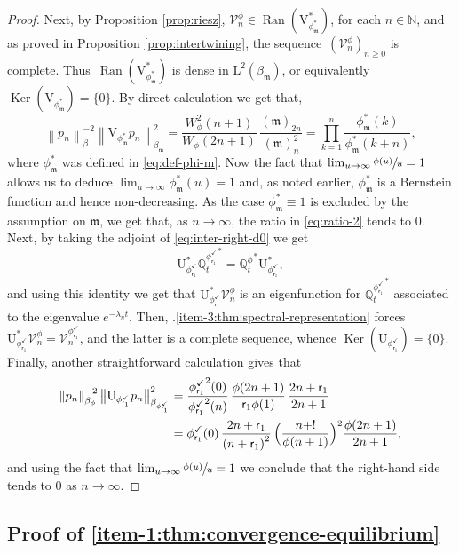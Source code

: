 \documentclass[JEP,XML,SOM,Unicode]{cedram}
\theoremstyle{plain}
\theoremstyle{definition}
\newcommand{\norm}[1]{\left\lVert#1\right\rVert}
\newcommand{\bnorm}[1]{\bigl\lVert#1\bigr\rVert}
\DeclareMathOperator{\Ran}{Ran}
\DeclareMathOperator{\Ker}{Ker}
\newcommand{\N}{\mathbb{N}}
\newcommand{\V}{\mathcal{V}}
\newcommand{\J}{\mathds{Q}}
\newcommand{\Leb}{\mathrm{L}}
\newcommand{\m}{\mathfrak{m}}
\newcommand{\lam}{{\bm{\lambda}_1}}
\newcommand{\vat}{{\mathsf{r}_1}}
\newcommand{\phm}{{\phi_\m^*}}
\renewcommand{\varphi}{{\phi_{\vat}^{\checkmark}}}
\newcommand{\gab}[1][\lam,\mo]{{\beta_{#1}}}
\let\mo\mu
\let\bpsi\beta
\begin{document}
\begin{proof}
Next, by Proposition \ref{prop:riesz}, \hbox{$\V_n^\phi \in \Ran(\mathrm{V}_{\phm}^*)$}, for each $n \in \N$, and as proved in Proposition \ref{prop:intertwining}, the sequence~$(\V_n^\phi)_{n \geq 0}$ is complete. Thus~$\Ran(\mathrm{V}_{\phm}^*)$ is dense in $\Leb^2(\gab[\m])$, or equivalently $\Ker(\mathrm{V}_{\phm}) = \{0\}$. By direct calculation we get that,
\begin{equation}
\label{eq:ratio-2}
\norm{p_n}_{\bpsi}^{-2} \norm{\mathrm{V}_{\phm} p_n}_{\gab[\m]}^2 = \frac{W_\phi^2(n+1)}{W_\phi(2n+1)}\, \frac{(\m)_{2n}}{(\m)_n^2} = \prod_{k=1}^n \frac{\phm(k)}{\phm(k+n)},
\end{equation}
where $\phm$ was defined in \eqref{eq:def-phi-m}. Now the fact that $\lim_{u \to \infty} \sfrac{\phi(u)}{u} = 1$ allows us to deduce $\lim_{u \to \infty} \phm(u) = 1$ and, as noted earlier, $\phm$ is a Bernstein function and hence non-decreasing. As the case $\phm \equiv 1$ is excluded by the assumption on $\m$, we get that, as $n \to \infty$, the ratio in \eqref{eq:ratio-2} tends to 0. Next, by taking the adjoint of \eqref{eq:inter-right-d0} we get
\begin{equation*}
\mathrm{U}_\varphi^* {\J_t^\varphi}^* = {\J_t^\phi}^* \mathrm{U}_\varphi^*,
\end{equation*}
and using this identity we get that $\mathrm{U}_\varphi^* \V_n^\phi$ is an eigenfunction for ${\J_t^\varphi}^*$ associated to the eigenvalue $e^{-\lambda_n t}$. Then, .\eqref{item-3:thm:spectral-representation} forces $\mathrm{U}_\varphi^* \V_n^\phi = \V_n^\varphi$, and the latter is a complete sequence, whence $\Ker(\mathrm{U}_\varphi) = \{0\}$. Finally, another straightforward calculation gives that
\begin{align*}
\norm{p_n}_{\bpsi_\phi}^{-2} \bnorm{\mathrm{U}_{\varphi} p_n}_{\bpsi_\varphi}^2 &= \frac{\varphi^2(0)}{\varphi^2(n)}\, \frac{\phi(2n+1)}{\vat \phi(1)}\, \frac{2n+\vat}{2n+1}\\
&= \varphi(0)\, \frac{2n+\vat}{\left(n+\vat\right)^2}\, \Bigl(\frac{n+!}{\phi(n+1)}\Bigr)^2 \frac{\phi(2n+1)}{2n+1},
\end{align*}
and using the fact that $\lim_{u \to \infty} \sfrac{\phi(u)}{u} = 1$ we conclude that the right-hand side tends to 0 as $n \to \infty$.
\end{proof}

\subsection{Proof of \eqref{item-1:thm:convergence-equilibrium}}
\end{document}
